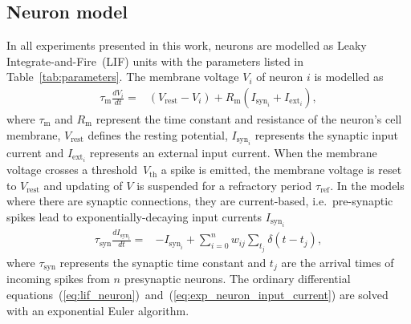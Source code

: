 \documentclass[9pt,a4paper]{amsart}
\begin{document}
\subsection{Neuron model}
\label{sec:methods/neuron_model}
In all experiments presented in this work, neurons are modelled as Leaky Integrate-and-Fire~(LIF) units with the parameters listed in Table~\ref{tab:parameters}.
The membrane voltage $V_{i}$ of neuron $i$ is modelled as
%
\begin{align}
    \tau_{\text{m}} \frac{dV_{i}}{dt} = & (V_{\text{rest}} - V_{i}) + R_{\text{m}}(I_{\text{syn}_{i}} + I_{\text{ext}_{i}}), \label{eq:lif_neuron}
\end{align}
%
where $\tau_{\text{m}}$ and $R_{\text{m}}$ represent the time constant and resistance of the neuron's cell membrane, $V_{\text{rest}}$ defines the resting potential, $I_{\text{syn}_{i}}$ represents the synaptic input current and $I_{\text{ext}_i}$ represents an external input current.
When the membrane voltage crosses a threshold~$V_{\text{th}}$ a spike is emitted, the membrane voltage is reset to $V_{\text{rest}}$ and updating of $V$ is suspended for a refractory period $\tau_{\text{ref}}$.
In the models where there are synaptic connections, they are current-based, i.e.~pre-synaptic spikes lead to exponentially-decaying input currents $I_{\text{syn}_{i}}$
%
\begin{align}
    \tau_{\text{syn}} \frac{dI_{\text{syn}_{i}}}{dt} = & -I_{\text{syn}_{i}} + \sum_{i=0}^{n} w_{ij} \sum_{t_{j}}  \delta(t - t_{j}),\label{eq:exp_neuron_input_current}
\end{align}
%
where $\tau_{\text{syn}}$ represents the synaptic time constant and $t_{j}$ are the arrival times of incoming spikes from $n$ presynaptic neurons.
The ordinary differential equations~(\ref{eq:lif_neuron})~and~(\ref{eq:exp_neuron_input_current}) are solved with an exponential Euler algorithm.
\end{document}
